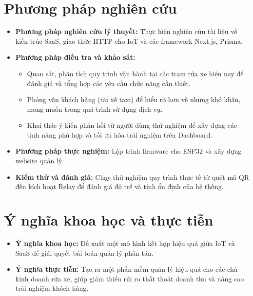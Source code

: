 \documentclass[../main.tex]{subfiles}
\begin{document}
\section*{Phương pháp nghiên cứu}
\begin{itemize}
    \item \textbf{Phương pháp nghiên cứu lý thuyết:} Thực hiện nghiên cứu tài liệu về kiến trúc SaaS, giao thức HTTP cho IoT và các framework Next.js, Prisma.
    \item \textbf{Phương pháp điều tra và khảo sát:}
    \begin{itemize}
        \item Quan sát, phân tích quy trình vận hành tại các trạm rửa xe hiện nay để đánh giá và tổng hợp các yêu cầu chức năng cần thiết.
        \item Phỏng vấn khách hàng (tài xế taxi) để hiểu rõ hơn về những khó khăn, mong muốn trong quá trình sử dụng dịch vụ.
        \item Khai thác ý kiến phản hồi từ người dùng thử nghiệm để xây dựng các tính năng phù hợp và tối ưu hóa trải nghiệm trên Dashboard.
    \end{itemize}
    \item \textbf{Phương pháp thực nghiệm:} Lập trình firmware cho ESP32 và xây dựng website quản lý.
    \item \textbf{Kiểm thử và đánh giá:} Chạy thử nghiệm quy trình thực tế từ quét mã QR đến kích hoạt Relay để đánh giá độ trễ và tính ổn định của hệ thống.
\end{itemize}

\section*{Ý nghĩa khoa học và thực tiễn}
\begin{itemize}
    \item \textbf{Ý nghĩa khoa học:} Đề xuất một mô hình kết hợp hiệu quả giữa IoT và SaaS để giải quyết bài toán quản lý phân tán.
    \item \textbf{Ý nghĩa thực tiễn:} Tạo ra một phần mềm quản lý hiệu quả cho các chủ kinh doanh rửa xe, giúp giảm thiểu rủi ro thất thoát doanh thu và nâng cao trải nghiệm khách hàng.
\end{itemize}
\end{document}
